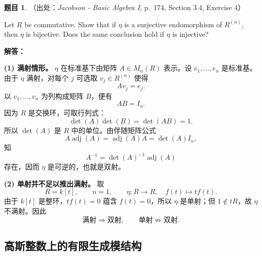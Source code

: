\documentclass[a4paper]{ctexart}
\theoremstyle{definition}
\newtheorem{example}{题目}[section]
\theoremstyle{analysis}
\theoremstyle{plain}
\begin{document}
\begin{example}
（出处：\textit{Jacobson - Basic Algebra I}, p.~174, Section 3.4, Exercise 4）

Let \(R\) be commutative. Show that if \(\eta\) is a surjective endomorphism of
\(R^{(n)}\), then \(\eta\) is bijective. Does the same conclusion hold if
\(\eta\) is injective?

\textbf{解答：}

\textbf{(1) 满射情形。}
\(\eta\) 在标准基下由矩阵 \(A\in M_n(R)\) 表示。设
\(e_1,\ldots,e_n\) 是标准基。由于 \(\eta\) 满射，对每个 \(j\)
可选取 \(v_j\in R^{(n)}\) 使得
\[
  Av_j=e_j.
\]
以 \(v_1,\ldots,v_n\) 为列构成矩阵 \(B\)，便有
\[
  AB=I_n.
\]
因为 \(R\) 是交换环，可取行列式：
\[
  \det(A)\det(B)=\det(AB)=1.
\]
所以 \(\det(A)\) 是 \(R\) 中的单位。由伴随矩阵公式
\[
  A\operatorname{adj}(A)=\operatorname{adj}(A)A=\det(A)I_n,
\]
知
\[
  A^{-1}=\det(A)^{-1}\operatorname{adj}(A)
\]
存在，因而 \(\eta\) 是可逆的，也就是双射。

\textbf{(2) 单射并不足以推出满射。}
取
\[
  R=k[t],\qquad n=1,\qquad
  \eta:R\longrightarrow R,\quad f(t)\longmapsto tf(t).
\]
由于 \(k[t]\) 是整环，\(tf(t)=0\) 蕴含 \(f(t)=0\)，所以 \(\eta\) 是单射；但
\(1\notin tR\)，故 \(\eta\) 不满射。因此
\[
  \text{满射}\Longrightarrow\text{双射},
  \qquad
  \text{单射}\not\Longrightarrow\text{双射}.
\]
\end{example}

\subsection{高斯整数上的有限生成模结构}
\label{subsec:problem-gaussian-integer-module}
\end{document}

